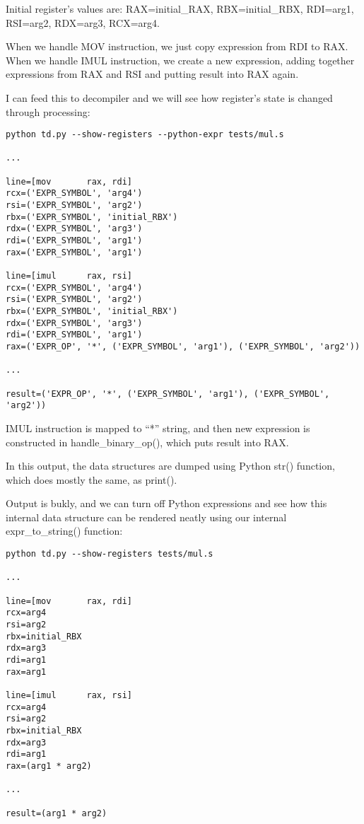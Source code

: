 ﻿\documentclass[12pt]{article}
\begin{document}
Initial register's values are:
RAX=initial\_RAX,
RBX=initial\_RBX,
RDI=arg1,
RSI=arg2,
RDX=arg3,
RCX=arg4.

When we handle MOV instruction, we just copy expression from RDI to RAX.
When we handle IMUL instruction, we create a new expression, adding together expressions from RAX and RSI and putting
result into RAX again.

I can feed this to decompiler and we will see how register's state is changed through processing:

\begin{lstlisting}
python td.py --show-registers --python-expr tests/mul.s

...

line=[mov       rax, rdi]
rcx=('EXPR_SYMBOL', 'arg4')
rsi=('EXPR_SYMBOL', 'arg2')
rbx=('EXPR_SYMBOL', 'initial_RBX')
rdx=('EXPR_SYMBOL', 'arg3')
rdi=('EXPR_SYMBOL', 'arg1')
rax=('EXPR_SYMBOL', 'arg1')

line=[imul      rax, rsi]
rcx=('EXPR_SYMBOL', 'arg4')
rsi=('EXPR_SYMBOL', 'arg2')
rbx=('EXPR_SYMBOL', 'initial_RBX')
rdx=('EXPR_SYMBOL', 'arg3')
rdi=('EXPR_SYMBOL', 'arg1')
rax=('EXPR_OP', '*', ('EXPR_SYMBOL', 'arg1'), ('EXPR_SYMBOL', 'arg2'))

...

result=('EXPR_OP', '*', ('EXPR_SYMBOL', 'arg1'), ('EXPR_SYMBOL', 'arg2'))
\end{lstlisting}

IMUL instruction is mapped to ``*'' string, and then new expression is constructed in 
handle\_binary\_op(), which puts result into RAX.

In this output, the data structures are dumped using Python str() function, which does mostly the same, as print().

Output is bukly, and we can turn off Python expressions and see how this internal data structure can be rendered neatly
using our internal expr\_to\_string() function:

\begin{lstlisting}
python td.py --show-registers tests/mul.s

...

line=[mov       rax, rdi]
rcx=arg4
rsi=arg2
rbx=initial_RBX
rdx=arg3
rdi=arg1
rax=arg1

line=[imul      rax, rsi]
rcx=arg4
rsi=arg2
rbx=initial_RBX
rdx=arg3
rdi=arg1
rax=(arg1 * arg2)

...

result=(arg1 * arg2)
\end{lstlisting}
\end{document}
